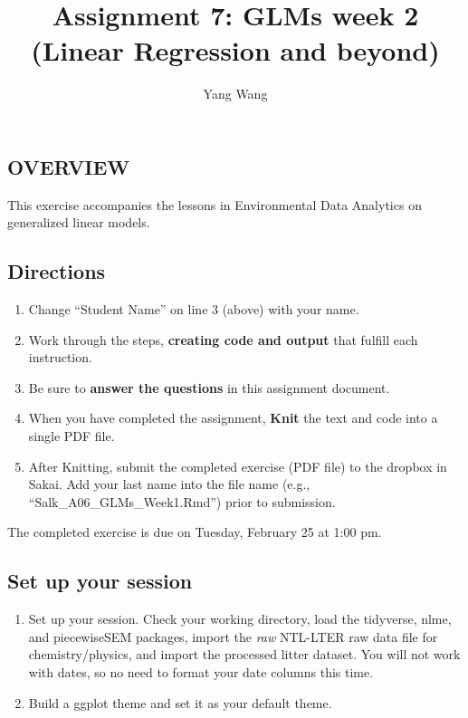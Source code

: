 \documentclass[]{article}
\title{Assignment 7: GLMs week 2 (Linear Regression and beyond)}
\author{Yang Wang}
\date{}
\providecommand{\tightlist}{%
  \setlength{\itemsep}{0pt}\setlength{\parskip}{0pt}}
\begin{document}
\maketitle

\hypertarget{overview}{%
\subsection{OVERVIEW}\label{overview}}

This exercise accompanies the lessons in Environmental Data Analytics on
generalized linear models.

\hypertarget{directions}{%
\subsection{Directions}\label{directions}}

\begin{enumerate}
\def\labelenumi{\arabic{enumi}.}
\tightlist
\item
  Change ``Student Name'' on line 3 (above) with your name.
\item
  Work through the steps, \textbf{creating code and output} that fulfill
  each instruction.
\item
  Be sure to \textbf{answer the questions} in this assignment document.
\item
  When you have completed the assignment, \textbf{Knit} the text and
  code into a single PDF file.
\item
  After Knitting, submit the completed exercise (PDF file) to the
  dropbox in Sakai. Add your last name into the file name (e.g.,
  ``Salk\_A06\_GLMs\_Week1.Rmd'') prior to submission.
\end{enumerate}

The completed exercise is due on Tuesday, February 25 at 1:00 pm.

\hypertarget{set-up-your-session}{%
\subsection{Set up your session}\label{set-up-your-session}}

\begin{enumerate}
\def\labelenumi{\arabic{enumi}.}
\item
  Set up your session. Check your working directory, load the tidyverse,
  nlme, and piecewiseSEM packages, import the \emph{raw} NTL-LTER raw
  data file for chemistry/physics, and import the processed litter
  dataset. You will not work with dates, so no need to format your date
  columns this time.
\item
  Build a ggplot theme and set it as your default theme.
\end{enumerate}
\end{document}

